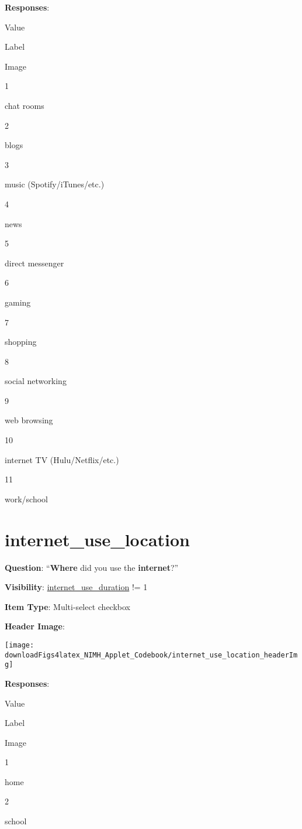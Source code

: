 \documentclass[]{book}
\begin{document}
\textbf{Responses}:

Value

Label

Image

1

chat rooms

2

blogs

3

music (Spotify/iTunes/etc.)

4

news

5

direct messenger

6

gaming

7

shopping

8

social networking

9

web browsing

10

internet TV (Hulu/Netflix/etc.)

11

work/school

\hypertarget{internet_use_location}{%
\section{internet\_use\_location}\label{internet_use_location}}

\textbf{Question}: ``\textbf{Where} did you use the \textbf{internet}?''

\textbf{Visibility}: \protect\hyperlink{internet_use_duration}{internet\_use\_duration} != 1

\textbf{Item Type}: Multi-select checkbox

\textbf{Header Image}:

\begin{flushleft}\texttt{[image: downloadFigs4latex\_NIMH\_Applet\_Codebook/internet\_use\_location\_headerImg]} \end{flushleft}

\textbf{Responses}:

Value

Label

Image

1

home

2

school
\end{document}
